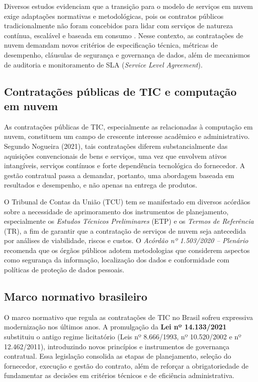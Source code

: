 \documentclass[a4paper, 12pt,brazil]{article}
\begin{document}
Diversos estudos evidenciam que a transição para o modelo de serviços em nuvem exige adaptações normativas e metodológicas, pois os contratos públicos tradicionalmente não foram concebidos para lidar com serviços de natureza contínua, escalável e baseada em consumo \cite{bannister2018digital}. Nesse contexto, as contratações de nuvem demandam novos critérios de especificação técnica, métricas de desempenho, cláusulas de segurança e governança de dados, além de mecanismos de auditoria e monitoramento de SLA (\textit{Service Level Agreement}).

\subsection{Contratações públicas de TIC e computação em nuvem}

As contratações públicas de TIC, especialmente as relacionadas à computação em nuvem, constituem um campo de crescente interesse acadêmico e administrativo. Segundo Nogueira (2021), tais contratações diferem substancialmente das aquisições convencionais de bens e serviços, uma vez que envolvem ativos intangíveis, serviços contínuos e forte dependência tecnológica do fornecedor. A gestão contratual passa a demandar, portanto, uma abordagem baseada em resultados e desempenho, e não apenas na entrega de produtos.

O Tribunal de Contas da União (TCU) tem se manifestado em diversos acórdãos sobre a necessidade de aprimoramento dos instrumentos de planejamento, especialmente os \textit{Estudos Técnicos Preliminares} (ETP) e os \textit{Termos de Referência} (TR), a fim de garantir que a contratação de serviços de nuvem seja antecedida por análises de viabilidade, riscos e custos. O \textit{Acórdão nº 1.503/2020 – Plenário} recomenda que os órgãos públicos adotem metodologias que considerem aspectos como segurança da informação, localização dos dados e conformidade com políticas de proteção de dados pessoais.

\subsection{Marco normativo brasileiro}

O marco normativo que regula as contratações de TIC no Brasil sofreu expressiva modernização nos últimos anos. A promulgação da \textbf{Lei nº 14.133/2021} substituiu o antigo regime licitatório (Leis nº 8.666/1993, nº 10.520/2002 e nº 12.462/2011), introduzindo novos princípios e instrumentos de governança contratual. Essa legislação consolida as etapas de planejamento, seleção do fornecedor, execução e gestão do contrato, além de reforçar a obrigatoriedade de fundamentar as decisões em critérios técnicos e de eficiência administrativa.
\end{document}

